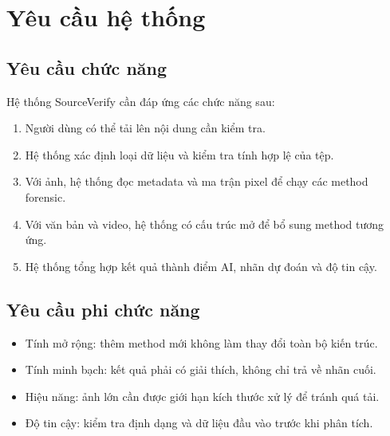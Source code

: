 \section{Yêu cầu hệ thống}
\subsection{Yêu cầu chức năng}
Hệ thống SourceVerify cần đáp ứng các chức năng sau:
\begin{enumerate}
  \item Người dùng có thể tải lên nội dung cần kiểm tra.
  \item Hệ thống xác định loại dữ liệu và kiểm tra tính hợp lệ của tệp.
  \item Với ảnh, hệ thống đọc metadata và ma trận pixel để chạy các method forensic.
  \item Với văn bản và video, hệ thống có cấu trúc mở để bổ sung method tương ứng.
  \item Hệ thống tổng hợp kết quả thành điểm AI, nhãn dự đoán và độ tin cậy.
\end{enumerate}

\subsection{Yêu cầu phi chức năng}
\begin{itemize}
  \item Tính mở rộng: thêm method mới không làm thay đổi toàn bộ kiến trúc.
  \item Tính minh bạch: kết quả phải có giải thích, không chỉ trả về nhãn cuối.
  \item Hiệu năng: ảnh lớn cần được giới hạn kích thước xử lý để tránh quá tải.
  \item Độ tin cậy: kiểm tra định dạng và dữ liệu đầu vào trước khi phân tích.
\end{itemize}
